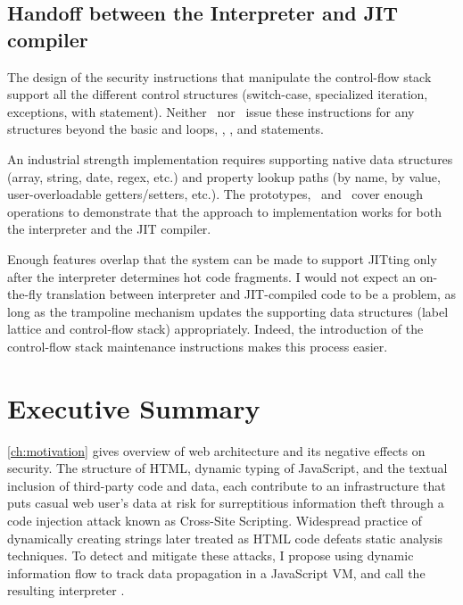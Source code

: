 \subsection{Handoff between the Interpreter and JIT compiler}

The design of the security instructions that manipulate the control-flow stack support all the different control structures (switch-case, specialized iteration, exceptions, with statement).
Neither \FlowCore\ nor \JitFlow\ issue these instructions for any structures beyond the basic  and  loops, , , and  statements.

An industrial strength implementation requires supporting native data structures (array, string, date, regex, etc.) and property lookup paths (by name, by value, user-overloadable getters/setters, etc.).
The prototypes, \FlowCore\ and \JitFlow\ cover enough operations to demonstrate that the approach to implementation works for both the interpreter and the JIT compiler.

Enough features overlap that the system can be made to support JITting only after the interpreter determines hot code fragments.
I would not expect an on-the-fly translation between interpreter and JIT-compiled code to be a problem, as long as the trampoline mechanism updates the supporting data structures (label lattice and control-flow stack) appropriately.
Indeed, the introduction of the control-flow stack maintenance instructions makes this process easier.

\section{Executive Summary}

\autoref{ch:motivation} gives overview of web architecture and its negative effects on security.
The structure of HTML, dynamic typing of JavaScript, and the textual inclusion of third-party code and data, each contribute to an infrastructure that puts casual web user's data at risk for surreptitious information theft through a code injection attack known as Cross-Site Scripting.
Widespread practice of dynamically creating strings later treated as HTML code defeats static analysis techniques.
To detect and mitigate these attacks, I propose using dynamic information flow to track data propagation in a JavaScript VM, and call the resulting interpreter \FlowCore.



